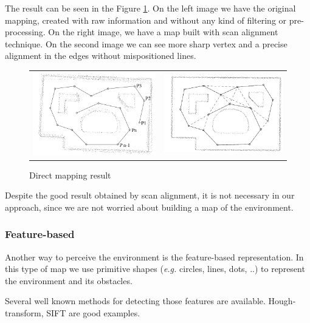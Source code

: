 The result can be seen in the Figure \ref{fig:mapping:direct:result}. On the left image we have the original mapping, created with raw information and without any kind of filtering or pre-processing. On the right image, we have a map built with scan alignment technique\cite{Lu:1997:GCR:591441.591464}. On the second image we can see more sharp vertex and a precise alignment in the edges without mispositioned lines.

\begin{figure}[h]
\centering
	\begin{tabular}{lr}\\
		\includegraphics[width=0.5\columnwidth]{img/fig:mapping:direct:a} &
		\includegraphics[width=0.5\columnwidth]{img/fig:mapping:direct:b}
	\end{tabular}
	\caption{Direct mapping result}
	\label{fig:mapping:direct:result}
\end{figure}

Despite the good result obtained by scan alignment, it is not necessary in our approach, since we are not worried about building a map of the environment. 

\subsubsection{Feature-based}

Another way to perceive the environment is the feature-based representation. In this type of map we use primitive shapes (\textit{e.g.} circles, lines, dots, ..) to represent the environment and its obstacles.

Several well known methods for detecting those features are available. Hough-transform, SIFT are good examples. 


